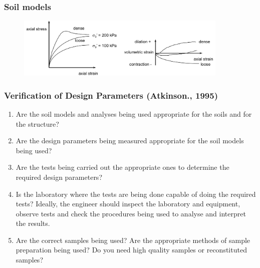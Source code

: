 \documentclass[notes]{beamer}
\begin{document}
\begin{frame}
\frametitle{Soil models}
\begin{figure}[ht]
	\centering
	\includegraphics[width=0.9\textwidth]{figs/soil-models.png}
\end{figure}
\end{frame}

\begin{frame}
\frametitle{Verification of Design Parameters (Atkinson., 1995)}
	\begin{enumerate}
		\item Are the soil models and analyses being used appropriate for the
		soils and for the structure?
		\item Are the design parameters being measured appropriate for the
		soil models being used?
		\item Are the tests being carried out the appropriate ones to determine
		the required design parameters?
		\item Is the laboratory where the tests are being done capable of doing
		the required tests? Ideally, the engineer should inspect the
		laboratory and equipment, observe tests and check the
		procedures being used to analyse and interpret the results.
		\item Are the correct samples being used? Are the appropriate methods
		of sample preparation being used? Do you need high quality
		samples or reconstituted samples?
	\end{enumerate}
\end{frame}
\end{document}
